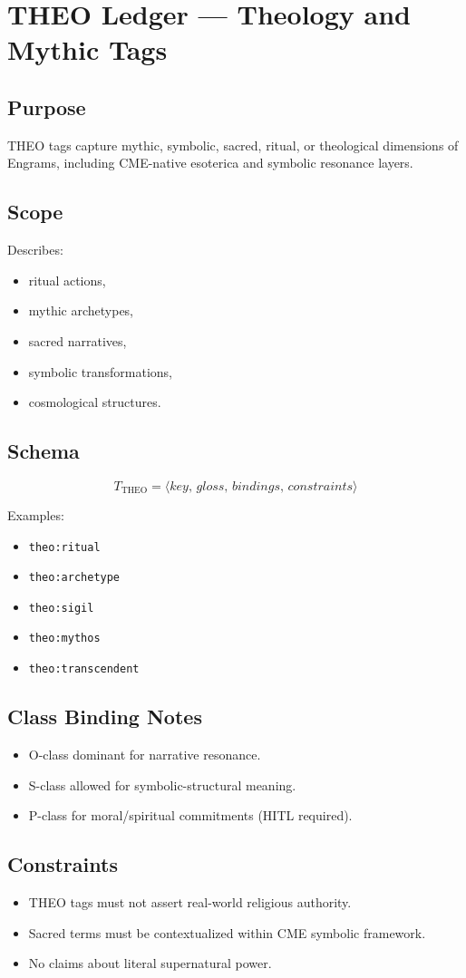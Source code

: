 \chapter{THEO Ledger --- Theology and Mythic Tags}
\label{chap:THEO_Ledger}

\section{Purpose}

THEO tags capture mythic, symbolic, sacred, ritual, or theological dimensions of
Engrams, including CME-native esoterica and symbolic resonance layers.

\section{Scope}

Describes:
\begin{itemize}
    \item ritual actions,
    \item mythic archetypes,
    \item sacred narratives,
    \item symbolic transformations,
    \item cosmological structures.
\end{itemize}

\section{Schema}

\[
T_{\text{THEO}} = \langle key,\, gloss,\, bindings,\, constraints \rangle
\]

Examples:
\begin{itemize}
    \item \texttt{theo:ritual}
    \item \texttt{theo:archetype}
    \item \texttt{theo:sigil}
    \item \texttt{theo:mythos}
    \item \texttt{theo:transcendent}
\end{itemize}

\section{Class Binding Notes}

\begin{itemize}
    \item O-class dominant for narrative resonance.
    \item S-class allowed for symbolic-structural meaning.
    \item P-class for moral/spiritual commitments (HITL required).
\end{itemize}

\section{Constraints}

\begin{itemize}
    \item THEO tags must not assert real-world religious authority.
    \item Sacred terms must be contextualized within CME symbolic framework.
    \item No claims about literal supernatural power.
\end{itemize}
